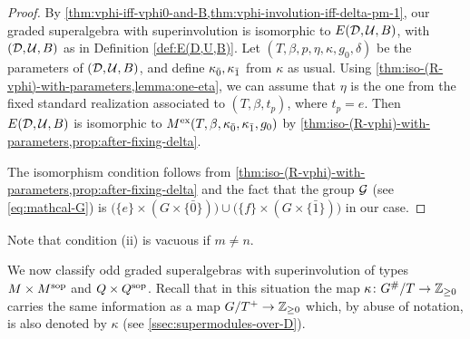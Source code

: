 \begin{proof}
    By \cref{thm:vphi-iff-vphi0-and-B,thm:vphi-involution-iff-delta-pm-1}, our graded superalgebra with superinvolution is isomorphic to $E(\mathcal{D}, \mathcal U, B)$, with $(\mathcal{D}, \mathcal U, B)$ as in Definition \ref{def:E(D,U,B)}. 
    Let $(T, \beta, p, \eta, \kappa, g_0, \delta)$ be the parameters of $(\mathcal{D}, \mathcal U, B)$, and define $\kappa_{\bar{0}}, \kappa_{\bar{1}}$ from $\kappa$ as usual. 
    Using \cref{thm:iso-(R-vphi)-with-parameters,lemma:one-eta}, we can assume that $\eta$ is the one from the fixed standard realization associated to $(T, \beta, t_p)$, where $t_p = e$. 
    Then $E(\mathcal{D}, \mathcal U, B)$ is isomorphic to $M^{\mathrm{ex}} (T, \beta, \kappa_{\bar{0}}, \kappa_{\bar{1}}, g_0)$ by \cref{thm:iso-(R-vphi)-with-parameters,prop:after-fixing-delta}. 
    
    The isomorphism condition follows from \cref{thm:iso-(R-vphi)-with-parameters,prop:after-fixing-delta} and the fact that the group $\mathcal G$ (see \cref{eq:mathcal-G}) is $\big( \{e\} \times (G \times \{ \bar 0 \}) \big) \cup \big( \{f\} \times (G \times \{ \bar 1 \}) \big)$ in our case.
\end{proof}

\begin{remark}
    Note that condition (ii) is vacuous if $m \neq n$. 
\end{remark}


We now classify odd graded superalgebras with superinvolution of types $M\times M^{\mathrm{sop}}$ and $Q \times Q^{\mathrm{sop}}$. 
Recall that in this situation the map $\kappa\colon G^\#/T \to \mathbb{Z}_{\geq 0}$ carries the same information as a map $G/T^+ \to \mathbb{Z}_{\geq 0}$ which, by abuse of notation, is also denoted by $\kappa$ (see \cref{ssec:supermodules-over-D}). 


